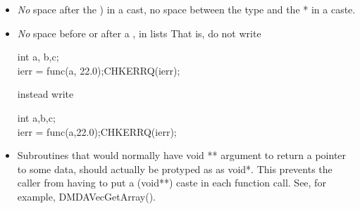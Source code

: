 \documentclass[twoside,12pt]{../sty/report_petsc}
\begin{document}
\begin{itemize}
\item {\em No} space after the ) in a cast, no space between the type and the * in a caste.
\item {\em No} space before or after a , in lists
That is, do not write
\begin{tabbing}
    int a, b,c;\\
    ierr = func(a, 22.0);CHKERRQ(ierr);
\end{tabbing}
instead write
\begin{tabbing}
    int a,b,c;\\
    ierr = func(a,22.0);CHKERRQ(ierr);
\end{tabbing}

\item Subroutines that would normally have void ** argument to return a pointer to some data, should actually be protyped as as void*. This prevents the caller from having to put a (void**) caste in each function call. See, for example, DMDAVecGetArray().


\end{itemize}
\end{document}
